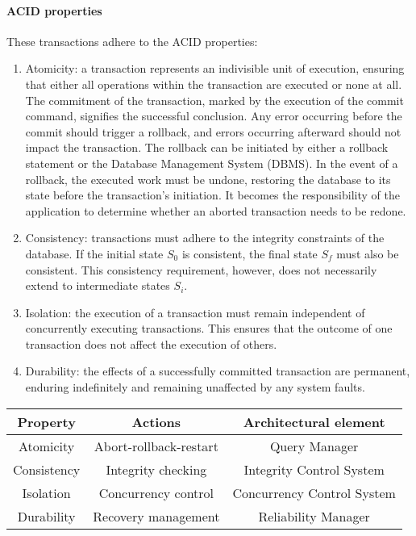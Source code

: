 \paragraph*{ACID properties}
These transactions adhere to the ACID properties:
\begin{enumerate}
    \item Atomicity: a transaction represents an indivisible unit of execution, ensuring that either all operations within the transaction are executed or none at all.
        The commitment of the transaction, marked by the execution of the commit command, signifies the successful conclusion. 
        Any error occurring before the commit should trigger a rollback, and errors occurring afterward should not impact the transaction.        
        The rollback can be initiated by either a rollback statement or the Database Management System (DBMS).
        In the event of a rollback, the executed work must be undone, restoring the database to its state before the transaction's initiation.
        It becomes the responsibility of the application to determine whether an aborted transaction needs to be redone.
    \item Consistency: transactions must adhere to the integrity constraints of the database.
        If the initial state $S_0$ is consistent, the final state $S_f$ must also be consistent. 
        This consistency requirement, however, does not necessarily extend to intermediate states $S_i$.
    \item Isolation: the execution of a transaction must remain independent of concurrently executing transactions. 
        This ensures that the outcome of one transaction does not affect the execution of others.
    \item Durability: the effects of a successfully committed transaction are permanent, enduring indefinitely and remaining unaffected by any system faults.
\end{enumerate}
\begin{table}[H]
    \centering
    \begin{tabular}{c|c|c}
    \textbf{Property} & \textbf{Actions}       & \textbf{Architectural element} \\ \hline
    Atomicity         & Abort-rollback-restart & Query Manager                  \\
    Consistency       & Integrity checking     & Integrity Control System       \\
    Isolation         & Concurrency control    & Concurrency Control System     \\
    Durability        & Recovery management    & Reliability Manager           
    \end{tabular}
\end{table}